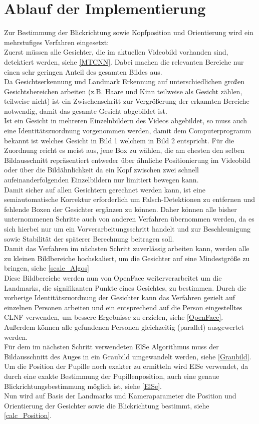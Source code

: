 \section{Ablauf der Implementierung}

Zur Bestimmung der Blickrichtung sowie Kopfposition und Orientierung wird ein mehrstufiges Verfahren eingesetzt:\\
Zuerst müssen alle Gesichter, die im aktuellen Videobild vorhanden sind, detektiert werden, siehe \autoref{MTCNN}. Dabei machen die relevanten Bereiche nur einen sehr geringen Anteil des gesamten Bildes aus.\\
Da Gesichtserkennung und Landmark Erkennung auf unterschiedlichen großen Gesichtsbereichen arbeiten (z.B. Haare und Kinn teilweise als Gesicht zählen, teilweise nicht) ist ein Zwischenschritt zur Vergrößerung der erkannten Bereiche notwendig, damit das gesamte Gesicht abgebildet ist.\\
Ist ein Gesicht in mehreren Einzelnbildern des Videos abgebildet, so muss auch eine Identitätszuordnung vorgenommen werden, damit dem Computerprogramm bekannt ist welches Gesicht in Bild 1 welchem in Bild 2 entspricht. Für die Zuordnung reicht es meist aus, jene Box zu wählen, die am ehesten den selben Bildausschnitt repräsentiert entweder über ähnliche Positionierung im Videobild oder über die Bildähnlichkeit da ein Kopf zwischen zwei schnell aufeinanderfolgenden Einzelbildern nur limitiert bewegen kann.\\
Damit sicher auf allen Gesichtern gerechnet werden kann, ist eine semiautomatische Korrektur erforderlich um Falsch-Detektionen zu entfernen und fehlende Boxen der Gesichter ergänzen zu können. Daher können alle bisher unternommenen Schritte auch von anderen Verfahren übernommen werden, da es sich hierbei nur um ein Vorverarbeitungsschritt handelt und zur Beschleunigung sowie Stabilität der späterer Berechnung beitragen soll.\\
Damit das Verfahren im nächsten Schritt zuverlässig arbeiten kann, werden alle zu kleinen Bildbereiche hochskaliert, um die Gesichter auf eine Mindestgröße zu bringen, siehe \autoref{scale_Algos}\\
Diese Bildbereiche werden nun von OpenFace weiterverarbeitet um die Landmarks, die signifikanten Punkte eines Gesichtes, zu bestimmen. Durch die vorherige Identitätszuordnung der Gesichter kann das Verfahren gezielt auf einzelnen Personen arbeiten und ein entsprechend auf die Person eingestelltes CLNF verwenden, um bessere Ergebnisse zu erzielen, siehe \autoref{OpenFace}. Außerdem können alle gefundenen Personen gleichzeitig (parallel) ausgewertet werden.\\
Für dem im nächsten Schritt verwendeten ElSe Algorithmus muss der Bildausschnitt des Auges in ein Graubild umgewandelt werden, siehe \autoref{Graubild}.\\
Um die Position der Pupille noch exakter zu ermitteln wird ElSe verwendet, da durch eine exakte Bestimmung der Pupillenposition, auch eine genaue Blickrichtungsbestimmung möglich ist, siehe \autoref{ElSe}.\\
Nun wird auf Basis der Landmarks und Kameraparameter die Position und Orientierung der Gesichter sowie die Blickrichtung bestimmt, siehe \autoref{calc_Position}.